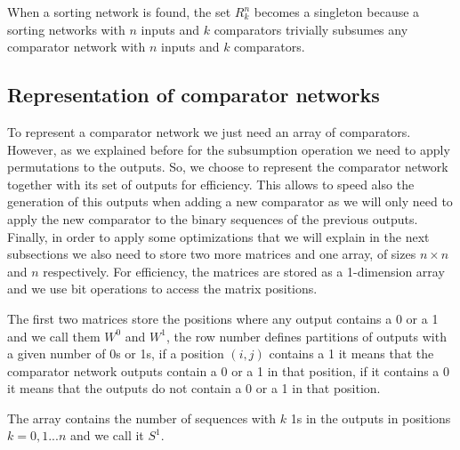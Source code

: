 \documentclass[../main.tex]{subfiles}
\begin{document}
	When a sorting network is found, the set $R^n_k$ becomes a singleton because a sorting networks with $n$ inputs and $k$ comparators trivially subsumes any comparator network with $n$ inputs and $k$ comparators.
	
	\subsection{Representation of comparator networks}
	To represent a comparator network we just need an array of comparators. However, as we explained before for the subsumption operation we need to apply permutations to the outputs. So, we choose to represent the comparator network together with its set of outputs for efficiency. This allows to speed also the generation of this outputs when adding a new comparator as we will only need to apply the new comparator to the binary sequences of the previous outputs. Finally, in order to apply some optimizations that we will explain in the next subsections we also need to store two more matrices and one array, of sizes $n \times n$ and $n$ respectively. For efficiency, the matrices are stored as a 1-dimension array and we use bit operations to access the matrix positions.
	
	The first two matrices store the positions where any output contains a 0 or a 1 and we call them $W^0$ and $W^1$, the row number defines partitions of outputs with a given number of 0s or 1s, if a position $(i,j)$ contains a 1 it means that the comparator network outputs contain a 0 or a 1 in that position, if it contains a 0 it means that the outputs do not contain a 0 or a 1 in that position.
	
	The array contains the number of sequences with $k$ 1s in the outputs in positions $k=0,1...n$ and we call it $S^{1}$.
	
\end{document}
